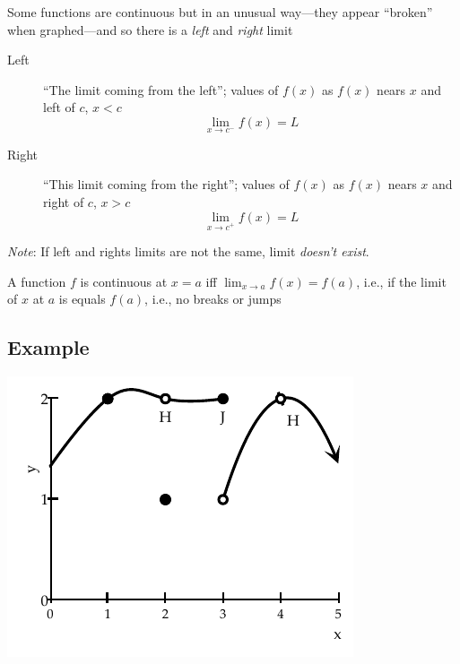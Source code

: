 Some functions are continuous but in an unusual way---they appear ``broken'' when graphed---and so there is a \textit{left} and \textit{right} limit

\begin{description}
    \item[Left] ``The limit coming from the left''; values of $f(x)$ as $f(x)$ nears $x$ and left of $c$, $x < c$
        \begin{equation}
            \lim_{x \rightarrow c^-} f(x) = L
        \end{equation}
    \item[Right] ``This limit coming from the right''; values of $f(x)$ as $f(x)$ nears $x$ and right of $c$, $x > c$
        \begin{equation}
            \lim_{x \rightarrow c^+} f(x) = L
        \end{equation}
    
\end{description}

\textit{Note}: If left and rights limits are not the same, limit \textit{doesn't exist}.
\hformbar




A function $f$ is continuous at $x = a$ iff $\lim_{x \rightarrow a} f(x) = f(a)$,
i.e., if the limit of $x$ at $a$ is equals $f(a)$, i.e., no breaks or jumps

\subsection*{Example}

\begin{center}
    \includegraphics{continuity}
\end{center}

